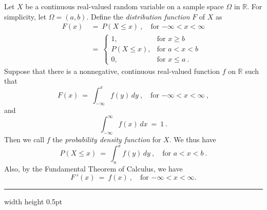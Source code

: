 Let $X$ be a continuous real-valued random variable on a sample space $\Omega$ in $\mathbb{R}$. For simplicity, let
$\Omega= (a,b)$. Define the \emph{distribution function} $F$ of $X$ as
\begin{align}\label{eqn:distribfcn}
 F(x) ~&=~ P(X \le x)~, \quad \text{for $-\infty < x < \infty$}\\
  &=~ \begin{cases}
   1, &\text{for $x \ge b$}\\
   P(X \le x), &\text{for $a < x < b$}\\
   0, &\text{for $x \le a~$.}
  \end{cases}
\end{align}
Suppose that there is a nonnegative, continuous real-valued function $f$ on $\mathbb{R}$ such that
\begin{equation}\label{eqn:pdf}
 F(x) ~=~ \int_{-\infty}^x f(y)\,dy~, \quad \text{for $-\infty < x < \infty$} ~,
\end{equation}
and
\begin{equation}\label{eqn:pdfint}
\int_{-\infty}^{\infty} f(x)\,dx ~=~ 1 ~.
\end{equation}
Then we call $f$ the \emph{probability density function}  for $X$. 
We thus have
\begin{equation}\label{eqn:pdfprob}
 P(X \le x) ~=~ \int_{a}^x f(y)\,dy~, \quad \text{for $a < x < b$} ~.
\end{equation}
Also, by the Fundamental Theorem of Calculus, we have
\begin{equation}\label{eqn:pdfderiv}
 F\,'(x) ~=~ f(x)~, \quad \text{for $-\infty < x < \infty$.}
\end{equation}
\hrule width \textwidth height 0.5pt
